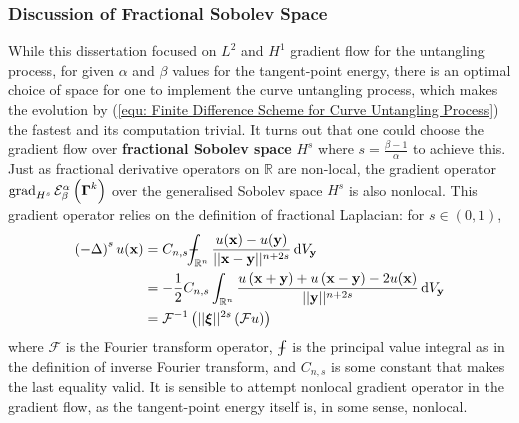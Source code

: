 \documentclass[../dissertation.tex]{subfiles}
\begin{document}
\subsubsection{Discussion of Fractional Sobolev Space}
While this dissertation focused on $L^2$ and $H^1$ gradient flow for the untangling process,
for given $\alpha$ and $\beta$ values for the tangent-point energy,
there is an optimal choice of space for one to implement the curve untangling process,
which makes the evolution by (\ref{equ: Finite Difference Scheme for Curve Untangling Process}) the fastest
and its computation trivial.
It turns out that one could choose the gradient flow over \textbf{fractional Sobolev space} $H^s$
where $s = \frac{\beta - 1}{\alpha}$ to achieve this\cite{YSC2021}.
Just as fractional derivative operators on $\mathbb{R}$ are non-local,
the gradient operator $\operatorname{grad}_{H^s} \mathcal{E}_{\beta}^{\alpha} \left( \boldsymbol{\Gamma}^k \right)$ over
the generalised Sobolev space $H^s$ is also nonlocal.
This gradient operator relies on the definition of fractional Laplacian\cite{DINEZZA2012521}:
for $s \in \left( 0,1 \right)$,
\begin{align}
    \left( -\laplacian \right)^s u(\xbf) &= C_{n,s} \dashint_{\mathbb{R}^n} \frac{u(\xbf) - u(\ybf)}{\norm{\xbf - \ybf}^{n+2s}} \intd V_{\ybf} \\
    &= -\frac{1}{2} C_{n,s} \int_{\mathbb{R}^n} \frac{u\left( \xbf + \ybf \right) + u\left( \xbf - \ybf \right) - 2 u(\xbf)}{\norm{\ybf}^{n+2s}} \intd V_{\ybf} \\
    &= \mathcal{F}^{-1} \left( \norm{\xibf}^{2s} \left( \mathcal{F} u \right) \right)
\end{align}
where $\mathcal{F}$ is the Fourier transform operator, $\dashint$ is the principal value integral as in the definition of inverse Fourier transform, and $C_{n,s}$ is some constant that makes the last equality valid.
It is sensible to attempt nonlocal gradient operator in the gradient flow, as the tangent-point energy itself is, in some sense, nonlocal.
\end{document}
